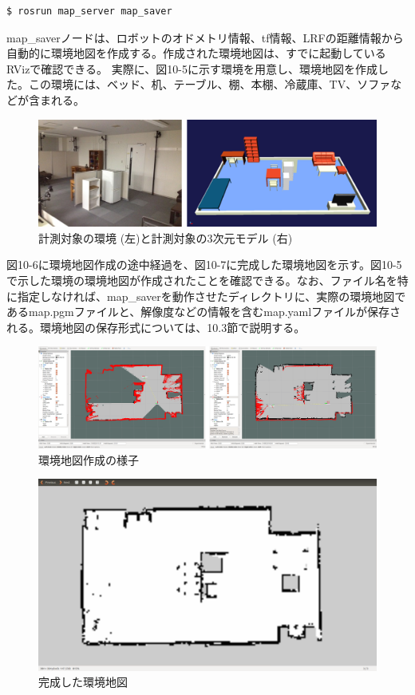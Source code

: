 \begin{lstlisting}[language=ROS]
$ rosrun map_server map_saver
\end{lstlisting}

map\_saverノードは、ロボットのオドメトリ情報、tf情報、LRFの距離情報から自動的に環境地図を作成する。作成された環境地図は、すでに起動しているRVizで確認できる。
実際に、図10-5に示す環境を用意し、環境地図を作成した。この環境には、ベッド、机、テーブル、棚、本棚、冷蔵庫、TV、ソファなどが含まれる。

\begin{figure}[ht]
  \centering
  \includegraphics[width=\columnwidth]{pictures/chapter10/pic_10_05.png}
  \caption{計測対象の環境 (左)と計測対象の3次元モデル (右)}
\end{figure}

図10-6に環境地図作成の途中経過を、図10-7に完成した環境地図を示す。図10-5で示した環境の環境地図が作成されたことを確認できる。なお、ファイル名を特に指定しなければ、map\_saverを動作させたディレクトリに、実際の環境地図であるmap.pgmファイルと、解像度などの情報を含むmap.yamlファイルが保存される。環境地図の保存形式については、10.3節で説明する。

\begin{figure}[ht]
  \centering
  \includegraphics[width=\columnwidth]{pictures/chapter10/pic_10_06.png}
  \caption{環境地図作成の様子}
\end{figure}

\begin{figure}[ht]
  \centering
  \includegraphics[width=\columnwidth]{pictures/chapter10/pic_10_07.png}
  \caption{完成した環境地図}
\end{figure}

